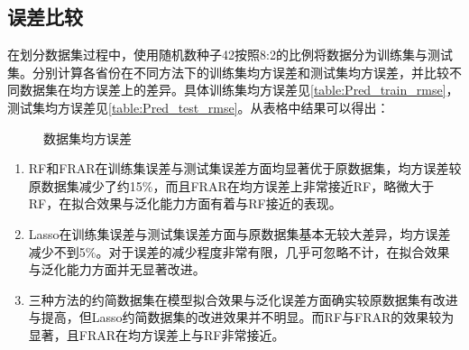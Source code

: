 \subsection{误差比较}
在划分数据集过程中，使用随机数种子42按照8:2的比例将数据分为训练集与测试集。分别计算各省份在不同方法下的训练集均方误差和测试集均方误差，并比较不同数据集在均方误差上的差异。具体训练集均方误差见\ref{table:Pred_train_rmse}，测试集均方误差见\ref{table:Pred_test_rmse}。从表格中结果可以得出：
\begin{figure*}[htbp]
  \centering
  \caption{数据集均方误差}
  \label{table:Pred_rmse}
\end{figure*}
\begin{enumerate}
  \item RF和FRAR在训练集误差与测试集误差方面均显著优于原数据集，均方误差较原数据集减少了约15\%，而且FRAR在均方误差上非常接近RF，略微大于RF，在拟合效果与泛化能力方面有着与RF接近的表现。
  \item Lasso在训练集误差与测试集误差方面与原数据集基本无较大差异，均方误差减少不到5\%。对于误差的减少程度非常有限，几乎可忽略不计，在拟合效果与泛化能力方面并无显著改进。
  \item 三种方法的约简数据集在模型拟合效果与泛化误差方面确实较原数据集有改进与提高，但Lasso约简数据集的改进效果并不明显。而RF与FRAR的效果较为显著，且FRAR在均方误差上与RF非常接近。
  \end{enumerate}
